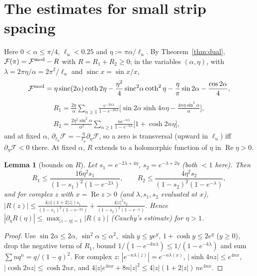 \documentclass[11pt]{article}
\newtheorem{lemma}[theorem]{Lemma}
\theoremstyle{definition}
\theoremstyle{remark}
\begin{document}
\section{The estimates for small strip spacing}\label{app:regionC}
Here $0<\alpha\le\pi/4$, $\ell_u<0.25$ and $\eta:=\pi\alpha/\ell_u$. By Theorem~\ref{thm:dual}, $\mathcal F(\pi)=\mathcal F^{\rm mod}-R$ with
$R=R_1+R_2\ge0$; in the variables $(\alpha,\eta)$, with $\lambda=2\pi\eta/\alpha=2\pi^2/\ell_u$ and $\operatorname{sinc}x=\sin x/x$,
\[
\mathcal F^{\rm mod}=\eta\operatorname{sinc}(2\alpha)\coth2\eta-\frac{\eta^2}4\operatorname{sinc}^2\!\alpha\coth^2\eta-\frac\eta\pi\sin2\alpha-\frac{\cos2\alpha}4,
\]
\begin{gather*}
R_1=\frac{2\eta}\alpha\sum_{n\ge1}\frac{e^{-2n\lambda}}{1-e^{-2n\lambda}}\Big[\sin2\alpha\sinh4n\eta-\frac{4n\eta\sin^2\alpha}\alpha\Big],\\
R_2=\frac{2\eta^2\sin^2\alpha}{\alpha^2}\sum_{n\ge1}\frac{ne^{-n\lambda}}{1-e^{-n\lambda}}\big[1+\cosh2n\eta\big],
\end{gather*}
and at fixed $\alpha$, $\partial_{\ell_u}\mathcal F=-\frac\eta{\ell_u}\partial_\eta\mathcal F$, so a zero is transversal (upward in $\ell_u$) iff $\partial_\eta\mathcal F<0$ there.
At fixed $\alpha$, $R$ extends to a holomorphic function of $\eta$ in $\operatorname{Re}\eta>0$.

\begin{lemma}[bounds on $R$]\label{lem:Rbounds}
Let $s_1=e^{-2\lambda+4\eta}$, $s_2=e^{-\lambda+2\eta}$ (both $<1$ here). Then
\[
R_1\le\frac{16\eta^2s_1}{(1-s_1)^2(1-e^{-2\lambda})},\qquad R_2\le\frac{4\eta^2s_2}{(1-s_2)^2(1-e^{-\lambda})},
\]
and for complex $z$ with $x=\operatorname{Re}z>0$ (and $\lambda,s_1,s_2$ evaluated at $x$),
$|R(z)|\le\frac{4|z|(1+2|z|)s_1}{(1-s_1)^2(1-e^{-2\lambda})}+\frac{4|z|^2s_2}{(1-s_2)^2(1-e^{-\lambda})}$. Hence $|\partial_\eta R(\eta)|\le\max_{|z-\eta|=1}|R(z)|$
(Cauchy's estimate) for $\eta>1$.
\end{lemma}
\begin{proof}
Use $\sin2\alpha\le2\alpha$, $\sin^2\alpha\le\alpha^2$, $\sinh y\le ye^y$, $1+\cosh y\le2e^y$ ($y\ge0$), drop the negative term of $R_1$, bound
$1/(1-e^{-kn\lambda})\le1/(1-e^{-k\lambda})$ and sum $\sum nq^n=q/(1-q)^2$. For complex $z$: $|e^{-n\lambda(z)}|=e^{-n\lambda(x)}$,
$|\sinh4nz|\le e^{4nx}$, $|\cosh2nz|\le\cosh2nx$, and $4|z|e^{4nx}+8n|z|^2\le4|z|(1+2|z|)\,ne^{4nx}$.
\end{proof}
\end{document}
